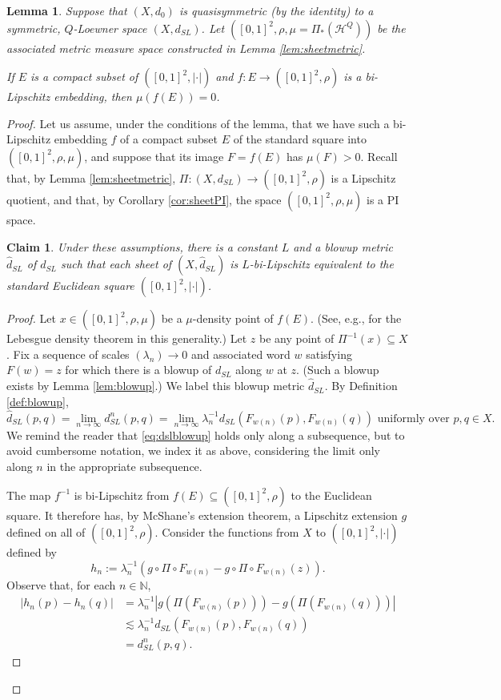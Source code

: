 \documentclass{amsart}
\theoremstyle{plain}
\newtheorem{claim}[theorem]{Claim}
\newtheorem{lemma}[theorem]{Lemma}
\theoremstyle{definition}
\numberwithin{equation}{section}
\numberwithin{theorem}{section}
\newcommand{\N}{\mathbb{N}}
\begin{document}
\begin{lemma}\label{lem:unrect}
Suppose that $(X,d_0)$ is quasisymmetric (by the identity) to a symmetric, $Q$-Loewner space $(X,d_{SL})$. Let $([0,1]^2, \rho, \mu=\Pi_*(\mathcal{H}^Q))$ be the associated metric measure space constructed in Lemma \ref{lem:sheetmetric}. 

If $E$ is a compact subset of $([0,1]^2, |\cdot|)$ and $f\colon E \rightarrow ([0,1]^2, \rho)$ is a bi-Lipschitz embedding, then $\mu(f(E))=0$.
\end{lemma}
\begin{proof}
Let us assume, under the conditions of the lemma, that we have such a bi-Lipschitz embedding $f$ of a compact subset $E$ of the standard square into $([0,1]^2, \rho, \mu)$, and suppose that its image $F=f(E)$ has $\mu(F)>0$. Recall that, by Lemma \ref{lem:sheetmetric}, $\Pi\colon (X,d_{SL})\rightarrow ([0,1]^2,\rho)$ is a Lipschitz quotient, and that, by Corollary \ref{cor:sheetPI}, the space $([0,1]^2, \rho, \mu)$ is a PI space.

\begin{claim}\label{claim:sheetbilip}
Under these assumptions, there is a constant $L$ and a blowup metric $\hat{d}_{SL}$ of $d_{SL}$ such that each sheet of $(X,\hat{d}_{SL})$ is $L$-bi-Lipschitz equivalent to the standard Euclidean square $([0,1]^2,|\cdot|)$.
\end{claim}

\begin{proof}
Let $x\in ([0,1]^2,\rho,\mu)$ be a $\mu$-density point of $f(E)$. (See, e.g., \cite[Ch. 1]{He} for the Lebesgue density theorem in this generality.) Let $z$ be any point of $\Pi^{-1}(x)\subseteq X$. Fix a sequence of scales $(\lambda_n)\rightarrow 0$ and associated word $w$ satisfying $F(w)=z$ for which there is a blowup of $d_{SL}$ along $w$ at $z$. (Such a blowup exists by Lemma \ref{lem:blowup}.) We label this blowup metric $\hat{d}_{SL}$. By Definition \ref{def:blowup}, 
\begin{equation}\label{eq:dslblowup}
 \hat{d}_{SL}(p,q) = \lim_{n\rightarrow\infty} d_{SL}^n(p,q)= \lim_{n\rightarrow\infty} \lambda_n^{-1} d_{SL}(F_{w(n)}(p), F_{w(n)}(q)) \text{ uniformly over } p,q\in X.
 \end{equation}
We remind the reader that \eqref{eq:dslblowup} holds only along a subsequence, but to avoid cumbersome notation, we index it as above, considering the limit only along $n$ in the appropriate subsequence. 

The map $f^{-1}$ is bi-Lipschitz from $f(E)\subseteq ([0,1]^2, \rho)$ to the Euclidean square. It therefore has, by McShane's extension theorem, a Lipschitz extension $g$ defined on all of $([0,1]^2,\rho)$. Consider the functions from $X$ to $([0,1]^2, |\cdot|)$ defined by
$$ h_n := \lambda_n^{-1}(g\circ \Pi\circ F_{w(n)}  - g\circ \Pi\circ F_{w(n)}(z)).$$
Observe that, for each $n\in\N$,
\begin{align*}
|h_n(p)-h_n(q)| &= \lambda_n^{-1}|g(\Pi(F_{w(n)}(p))) - g(\Pi(F_{w(n)}(q)))|\\
&\lesssim \lambda_n^{-1}d_{SL}(F_{w(n)}(p), F_{w(n)}(q))\\
&= d_{SL}^n(p,q).
\end{align*}


\end{proof}
\end{proof}
\end{document}
